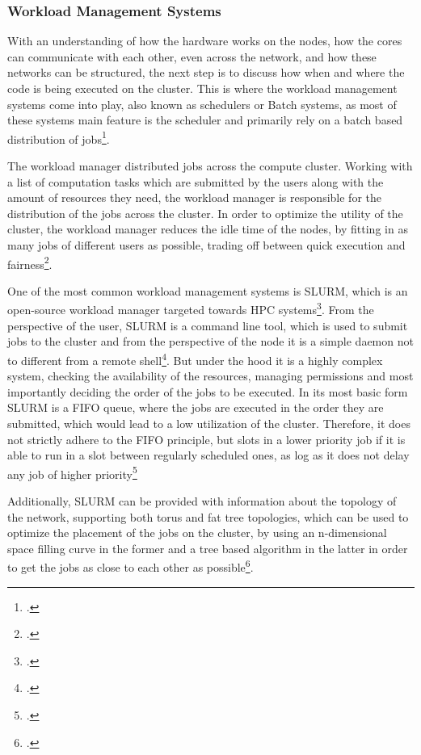 \subsubsection{Workload Management Systems}

With an understanding of how the hardware works on the nodes,
how the cores can communicate with each other, even across the network,
and how these networks can be structured, the next step is to discuss
how when and where the code is being executed on the cluster.
This is where the workload management systems come into play, also known as schedulers or Batch systems,
as most of these systems main feature is the scheduler and primarily rely on a batch based distribution of jobs\footcite{hovestadtSchedulingHPCResource2003}.

The workload manager distributed jobs across the compute cluster.
Working with a list of computation tasks which are submitted by the users along with the
amount of resources they need, the workload manager is responsible for the distribution of the jobs across the cluster.
In order to optimize the utility of the cluster, the workload manager reduces the idle time of the nodes,
by fitting in as many jobs of different users as possible, trading off between quick execution and fairness\footcite{hpcwikiSchedulersHowToRunApplicationsonasupercomputer}.

One of the most common workload management systems is \ac{SLURM}, which is an open-source workload manager targeted towards \ac{HPC} systems\footcite{yooSLURMSimpleLinux2003}.
From the perspective of the user, \ac{SLURM} is a command line tool, which is used to submit jobs to the cluster
and from the perspective of the node it is a simple \gls{daemon} not to different from a remote shell\footcite{schedmdSlurmWorkloadManagera}.
But under the hood it is a highly complex system, checking the availability of the resources,
managing permissions and most importantly deciding the order of the jobs to be executed.
In its most basic form \ac{SLURM} is a \ac{FIFO} queue, where the jobs are executed in the order they are submitted,
which would lead to a low utilization of the cluster. Therefore, it does not strictly adhere to the \ac{FIFO} principle,
but slots in a lower priority job if it is able to run in a slot between regularly scheduled ones, as log as it does not delay any job of higher priority\footcite{schedmdSlurmWorkloadManagerb}

Additionally, \ac{SLURM} can be provided with information about the topology of the network,
supporting both torus and fat tree topologies, which can be used to optimize the placement of the jobs on the cluster,
by using an n-dimensional space filling curve in the former and a tree based algorithm in the latter in order to get the jobs
as close to each other as possible\footcite{schedmdSlurmWorkloadManagerc}.

\pagebreak
